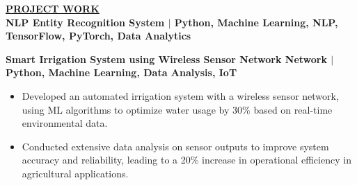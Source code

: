 \documentclass{article}
\begin{document}
\noindent \textbf{\underline{PROJECT WORK}} \\
\noindent \textbf{NLP Entity Recognition System $\mid$ {\small Python, Machine Learning, NLP, TensorFlow, PyTorch, Data Analytics}}
\vspace{2mm} 
\noindent \textbf{Smart Irrigation System using Wireless Sensor Network Network $\mid$ {\small Python, Machine Learning, Data Analysis, IoT}}
\begin{itemize}[noitemsep,nolistsep,leftmargin=*]
\item {\small Developed an automated irrigation system with a wireless sensor network, using ML algorithms to optimize water usage by 30\% based on real-time environmental data.}
\item {\small Conducted extensive data analysis on sensor outputs to improve system accuracy and reliability, leading to a 20\% increase in operational efficiency in agricultural applications.}
\end{itemize}




\end{document}
